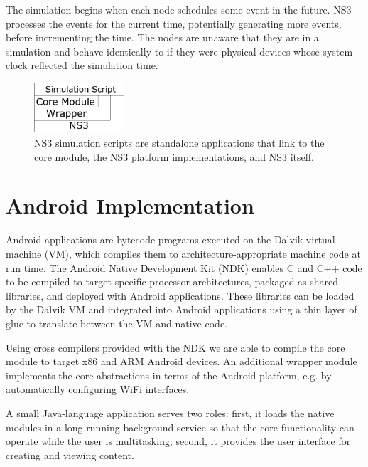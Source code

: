 \documentclass[10pt]{sig-alternate}
\begin{document}
The simulation begins when each node schedules some event in the future. NS3 processes the events for the current time, potentially generating more events, before incrementing the time. The nodes are unaware that they are in a simulation and behave identically to if they were physical devices whose system clock reflected the simulation time.

\begin{figure}[h]
  \begin{center}
    \includegraphics[width=0.30\textwidth]{ns3-impl.pdf}
  \end{center}

  \caption{\small NS3 simulation scripts are standalone applications that link to the core module, the NS3 platform implementations, and NS3 itself.}
  \label{fig:ns3-impl}
\end{figure}

\section{Android Implementation}

Android applications are bytecode programs executed on the Dalvik virtual machine (VM), which compiles them to architecture-appropriate machine code at run time. The Android Native Development Kit (NDK) enables C and C++ code to be compiled to target specific processor architectures, packaged as shared libraries, and deployed with Android applications. These libraries can be loaded by the Dalvik VM and integrated into Android applications using a thin layer of glue to translate between the VM and native code.

Using cross compilers provided with the NDK we are able to compile the core module to target x86 and ARM Android devices. An additional wrapper module implements the core abstractions in terms of the Android platform, e.g. by automatically configuring WiFi interfaces. 

A small Java-language application serves two roles: first, it loads the native modules in a long-running background service so that the core functionality can operate while the user is multitasking; second, it provides the user interface for creating and viewing content.
\end{document}

